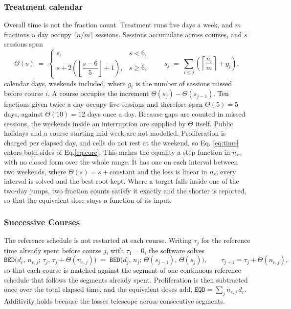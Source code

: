 \documentclass[preprint,12pt,number]{elsarticle}
\begin{document}
\subsubsection{Treatment calendar}
Overall time is not the fraction count. Treatment runs five days a week, and $m$ fractions a day occupy $\lceil n/m \rceil$ sessions. Sessions accumulate across courses, and $s$ sessions span
    \begin{equation}
    \Theta(s) \;=\;
    \begin{cases}
    s, & s < 6,\\[0.8ex]
    s + 2\left(\left\lfloor \dfrac{s-6}{5} \right\rfloor + 1\right), & s \geq 6,
    \end{cases}
    \qquad
    s_j \;=\; \sum_{i \leq j}\left(\left\lceil \frac{n_i}{m} \right\rceil + g_i\right),
    \label{eq:time}
    \end{equation}
calendar days, weekends included, where $g_i$ is the number of sessions missed before course $i$. A course occupies the increment $\Theta(s_j) - \Theta(s_{j-1})$. Ten fractions given twice a day occupy five sessions and therefore span $\Theta(5) = 5$ days, against $\Theta(10) = 12$ days once a day. Because gaps are counted in missed sessions, the weekends inside an interruption are supplied by $\Theta$ itself. Public holidays and a course starting mid-week are not modelled. Proliferation is charged per elapsed day, and cells do not rest at the weekend, so Eq. \eqref{eq:time} enters both sides of Eq.\eqref{eq:core}. This makes the equality a step function in $n_r$, with no closed form over the whole range. It has one on each interval between two weekends, where $\Theta(s) = s + \text{constant}$ and the loss is linear in $n_r$; every interval is solved and the best root kept. Where a target falls inside one of the two-day jumps, two fraction counts satisfy it exactly and the shorter is reported, so that the equivalent dose stays a function of its input.

\subsubsection{Successive Courses}
The reference schedule is not restarted at each course. Writing $\tau_j$ for the reference time already spent before course $j$, with $\tau_1 = 0$, the software solves
    \begin{equation}
    \texttt{BED}\big(d_r,\,n_{r,j};\,\tau_j,\,\tau_j + \Theta(n_{r,j})\big) \;=\; \texttt{BED}\big(d_j,\,n_j;\,\Theta(s_{j-1}),\,\Theta(s_j)\big), \qquad \tau_{j+1} = \tau_j + \Theta(n_{r,j}),
    \label{eq:multi}
    \end{equation}
so that each course is matched against the segment of one continuous reference schedule that follows the segments already spent. Proliferation is then subtracted once over the total elapsed time, and the equivalent doses add, $\texttt{EQD} = \sum_j n_{r,j}\,d_r$. Additivity holds because the losses telescope across consecutive segments.
\end{document}
